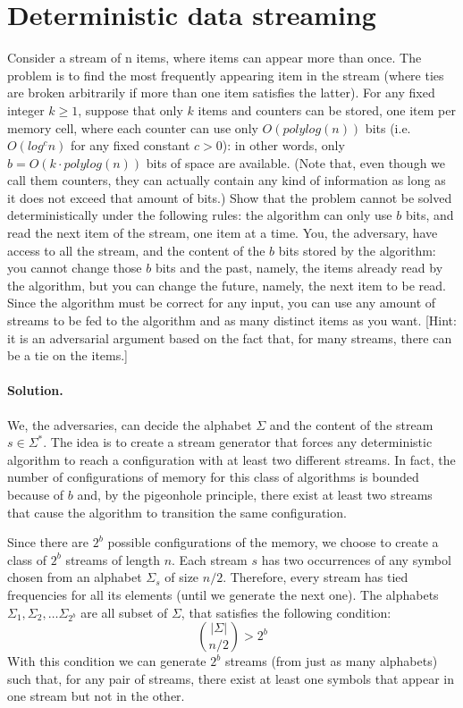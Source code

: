 \section{Deterministic data streaming}

Consider a stream of n items, where items can appear more than once. The problem is to find the most frequently appearing item in the stream (where ties are broken arbitrarily if more than one item satisfies the latter). For any fixed integer $k \geq 1$, suppose that only $k$ items and counters can be stored, one item per memory cell, where each counter can use only $O(polylog(n))$ bits (i.e. $O(log^c n)$ for any fixed constant $c > 0$): in other words, only $b = O(k\cdot polylog(n))$ bits of space are available. (Note that, even though we call them counters, they can actually contain any kind of information as long as it does not exceed that amount of bits.)
Show that the problem cannot be solved deterministically under the following rules: the algorithm can only use $b$ bits, and read the next item of the stream, one item at a time. You, the adversary, have access to all the stream, and the content of the $b$ bits stored by the algorithm: you cannot change those $b$ bits and the past, namely, the items already read by the algorithm, but you can change the future, namely, the next item to be read. Since the algorithm must be correct for any input, you can use any amount of streams to be fed to the algorithm and as many distinct items as you want. [Hint: it is an adversarial argument based on the fact that, for many streams, there can be a tie on the items.]

\vspace{0.5cm}
\paragraph{Solution.} We, the adversaries, can decide the alphabet $\Sigma$ and the content of the stream $s\in \Sigma^*$. The idea is to create a stream generator that forces any deterministic algorithm to reach a configuration with at least two different streams. In fact, the number of configurations of memory for this class of algorithms is bounded because of $b$ and, by the pigeonhole principle, there exist at least two streams that cause the algorithm to transition the same configuration.

Since there are $2^b$ possible configurations of the memory, we choose to create a class of $2^b$ streams of length $n$. Each stream $s$ has two occurrences of any symbol chosen from an alphabet $\Sigma_s$ of size $n/2$. Therefore, every stream has tied frequencies for all its elements (until we generate the next one). The alphabets $\Sigma_1, \Sigma_2, \dots \Sigma_{2^b}$ are all subset of $\Sigma$, that satisfies the following condition:
$${|\Sigma| \choose n/2} > 2^b$$
With this condition we can generate $2^b$ streams (from just as many alphabets) such that, for any pair of streams, there exist at least one symbols that appear in one stream but not in the other.

